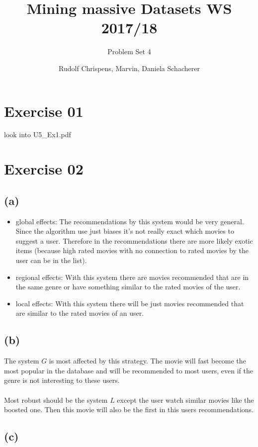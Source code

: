 \documentclass[11pt,a4paper]{scrartcl}
\title{Mining massive Datasets WS 2017/18}
\subtitle{Problem Set 4}
\author{Rudolf Chrispens, Marvin, Daniela Schacherer}
\begin{document}
\maketitle

\section*{Exercise 01}
look into U5\_Ex1.pdf

\section*{Exercise 02}

\subsection*{(a)}

\begin{itemize}
\item global effects: The recommendations by this system would be very general. Since the algorithm use just biases it's not really exact which movies to suggest a user. Therefore in the recommendations there are more likely exotic items (because high rated movies with no connection to rated movies by the user can be in the list).
\item regional effects: With this system there are movies recommended that are in the same genre or have something similar to the rated movies of the user.
\item local effects: With this system there will be just movies recommended that are similar to the rated movies of an user.
\end{itemize}

\subsection*{(b)}

The system $G$ is most affected by this strategy. The movie will fast become the most popular in the database and will be recommended to most users, even if the genre is not interesting to these users.\\\\
Most robust should be the system $L$ except the user watch similar movies like the boosted one. Then this movie will also be the first in this users recommendations.

\subsection*{(c)}
\end{document}
